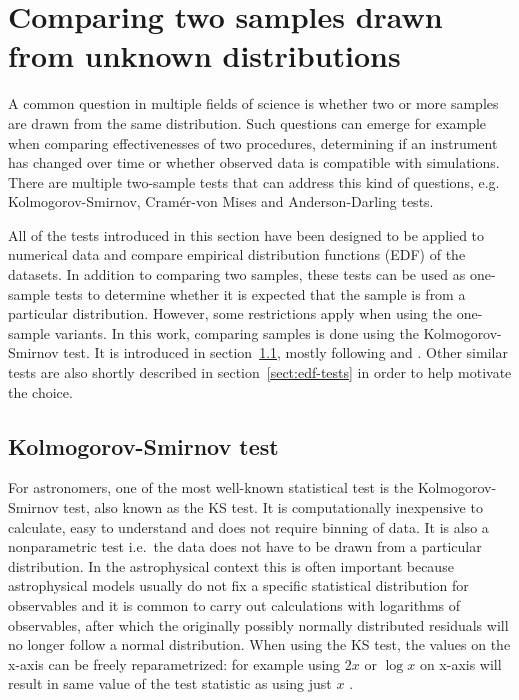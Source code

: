 \documentclass[english, twoside]{HYgradu}
\begin{document}
\section{Comparing two samples drawn from unknown distributions} \label{sect:statistical_tests}
A common question in multiple fields of science is whether two or more samples are drawn from the same distribution. Such questions can emerge for example when comparing effectivenesses of two procedures, determining if an instrument has changed over time or whether observed data is compatible with simulations. There are multiple two-sample tests that can address this kind of questions, e.g. Kolmogorov-Smirnov, Cram\'er-von Mises and Anderson-Darling tests.

All of the tests introduced in this section have been designed to be applied to numerical data and compare empirical distribution functions (EDF) of the datasets. In addition to comparing two samples, these tests can be used as one-sample tests to determine whether it is expected that the sample is from a particular distribution. However, some restrictions apply when using the one-sample variants. In this work, comparing samples is done using the Kolmogorov-Smirnov test. It is introduced in section~\ref{sect:ks}, mostly following \citet{bohm2010introduction} and \citet{feigelson2012modern}. Other similar tests are also shortly described in section~\ref{sect:edf-tests} in order to help motivate the choice.


\subsection{Kolmogorov-Smirnov test} \label{sect:ks}
For astronomers, one of the most well-known statistical test is the Kolmogorov-Smirnov test, also known as the KS test. It is computationally inexpensive to calculate, easy to understand and does not require binning of data. It is also a nonparametric test i.e.\ the data does not have to be drawn from a particular distribution. In the astrophysical context this is often important because astrophysical models usually do not fix a specific statistical distribution for observables and it is common to carry out calculations with logarithms of observables, after which the originally possibly normally distributed residuals  will no longer follow a normal distribution. When using the KS test, the values on the x-axis can be freely reparametrized: for example using $2x$ or $\log x$ on x-axis will result in same value of the test statistic as using just $x$ \citep{press2007numerical}.
\end{document}
